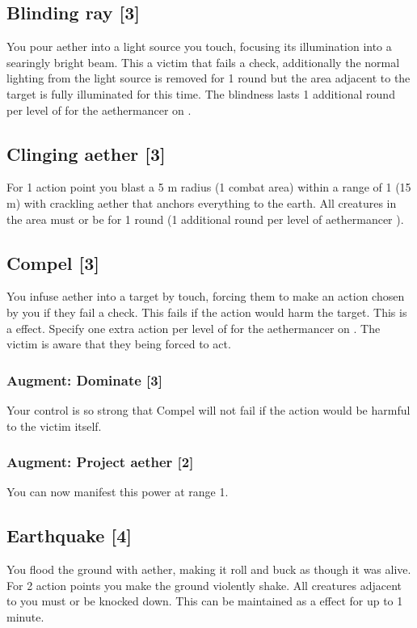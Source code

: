 \subsection{Blinding ray [3]}
\label{spell:blind-ray}
You pour aether into a light source you touch, focusing its illumination into a searingly bright beam. This  a victim that fails a  check, additionally the normal lighting from the light source is removed for 1 round but the area adjacent to the target is fully illuminated for this time. The blindness lasts 1 additional round per level of  for the aethermancer on .


\subsection{Clinging aether [3]}
For 1 action point you blast a 5 m radius (1 combat area) within a range of 1 (15 m) with crackling aether that anchors everything to the earth. All creatures in the area must  or be  for 1 round (1 additional round per level of aethermancer ).


\subsection{Compel [3]}
You infuse aether into a target by touch, forcing them to make an action chosen by you if they fail a  check. This fails if the action would harm the target. This is a  effect. Specify one extra action per level of  for the aethermancer on . The victim is aware that they being forced to act.
\subsubsection{Augment: Dominate [3]}
Your control is so strong that Compel will not fail if the action would be harmful to the victim itself.
\subsubsection{Augment: Project aether [2]}
You can now manifest this power at range 1.


\subsection{Earthquake [4]}
You flood the ground with aether, making it roll and buck as though it was alive. For 2 action points you make the ground violently shake. All creatures adjacent to you must  or be knocked down. This can be maintained as a  effect for up to 1 minute. 
